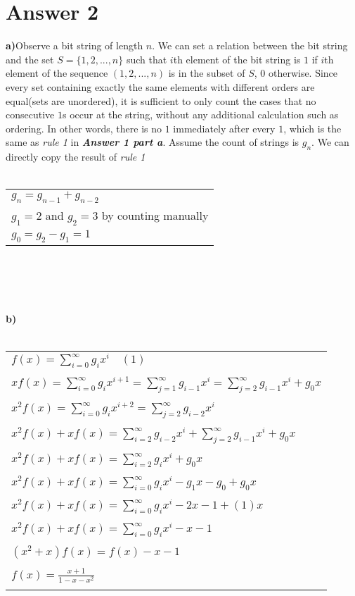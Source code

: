 \documentclass[12pt]{article}
\begin{document}
\section*{Answer 2}
\textbf{a)}Observe a bit string of length $n$. We can set a relation between the bit string 
and the set $S=\{1,2,...,n\}$ such that $i$th element of the bit string is $1$ if 
$i$th element of the sequence $(1,2,...,n)$ is in the subset of $S$, $0$ otherwise.
Since every set containing exactly the same elements with different orders are equal(sets are
unordered), it is sufficient to only count the cases that no consecutive $1$s occur at the
string, without any additional calculation such as ordering. In other words, there is 
no $1$ immediately after every $1$, which is the same as \textit{rule 1} in \textbf{\textit{Answer 1 part a}}. 
Assume the count of strings is $g_n$. We can directly copy the result of \textit{rule 1}
\\ \\
\begin{tabular}{l}
    $g_n=g_{n-1} + g_{n-2}$\\
    $g_1=2$ and $g_2=3$ by counting manually\\
    $g_0=g_2-g_1=1$\\
\end{tabular} 
\\ \\ \\ \\
\textbf{b)}
\\ \\
\begin{tabular}{l}
    $f(x)=\sum_{i=0}^{\infty}g_ix^i \quad (1)$\\
    \\
    $xf(x)=\sum_{i=0}^{\infty}g_ix^{i+1}=\sum_{j=1}^{\infty}g_{i-1}x^i=\sum_{j=2}^{\infty}g_{i-1}x^i+g_0x$\\
    \\
    $x^2f(x)=\sum_{i=0}^{\infty}g_ix^{i+2}=\sum_{j=2}^{\infty}g_{i-2}x^i$\\
    \\
    $x^2f(x)+xf(x)=\sum_{i=2}^{\infty}g_{i-2}x^i+\sum_{j=2}^{\infty}g_{i-1}x^i+g_0x$\\
    \\
    $x^2f(x)+xf(x)=\sum_{i=2}^{\infty}g_ix^i+g_0x$\\
    \\
    $x^2f(x)+xf(x)=\sum_{i=0}^{\infty}g_ix^i-g_1x-g_0+g_0x$\\
    \\
    $x^2f(x)+xf(x)=\sum_{i=0}^{\infty}g_ix^i-2x-1+(1)x$\\
    \\
    $x^2f(x)+xf(x)=\sum_{i=0}^{\infty}g_ix^i-x-1$\\
    \\
    $(x^2+x)f(x)=f(x)-x-1$\\
    \\
    $f(x)=\frac{x+1}{1-x-x^2}$\\
    \\
\end{tabular} 
\end{document}
